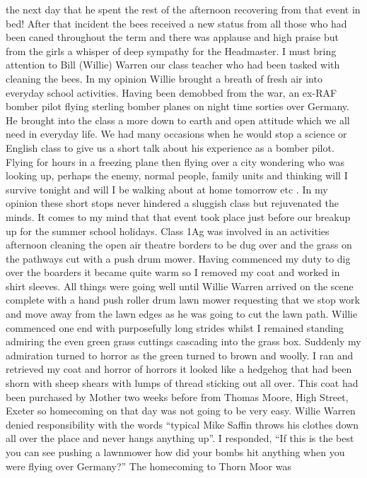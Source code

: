 the next day that he spent the rest of the afternoon recovering from that event
in bed!  After that incident the bees received a new status from all those who
had been caned throughout the term and there was applause and high praise but
from the girls a whisper of deep sympathy for the Headmaster. I must bring
attention to Bill (Willie) Warren our class teacher who had been tasked with
cleaning the bees.  In my opinion Willie brought a breath of fresh air into
everyday school activities.  Having been demobbed from the war, an ex-RAF
bomber pilot flying sterling bomber planes on night time sorties over Germany.
He brought into the class a more down to earth and open attitude which we all
need in everyday life. We had many occasions when he would stop a science or
English class to give us a short talk about his experience as a bomber pilot.
Flying for hours in a freezing plane then flying over a city wondering who was
looking up, perhaps the enemy, normal people, family units and thinking will I
survive tonight and will I be walking about at home tomorrow etc .  In my
opinion these short stops never hindered a sluggish class but rejuvenated the
minds.   It comes to my mind that that event took place just before our breakup
up for the summer school holidays. Class 1Ag was involved in an activities
afternoon cleaning the open air theatre borders to be dug over and the grass on
the pathways cut with a push drum mower. Having commenced my duty to dig over
the boarders it became quite warm so I removed my coat and worked in shirt
sleeves.  All things were going well until Willie Warren arrived on the scene
complete with a hand push roller drum lawn mower requesting that we stop work
and move away from the lawn edges as he was going to cut the lawn path.  Willie
commenced one end with purposefully long strides whilst I remained standing
admiring the even green grass cuttings cascading into the grass box.  Suddenly
my admiration turned to horror as the green turned to brown and woolly.  I ran
and retrieved my coat and horror of horrors it looked like a hedgehog that had
been shorn with sheep shears with lumps of thread sticking out all over.  This
coat had been purchased by Mother two weeks before from Thomas Moore, High
Street, Exeter so homecoming on that day was not going to be very easy. Willie
Warren denied responsibility with the words ``typical Mike Saffin throws his
clothes down all over the place and never hangs anything up''.  I responded,
``If this is the best you can see pushing a lawnmower how did your bombs hit
anything when you were flying over Germany?'' The homecoming to Thorn Moor was
